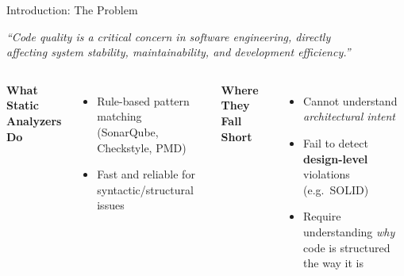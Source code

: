 \documentclass[aspectratio=169,10pt]{beamer}
\begin{document}
\begin{frame}{Introduction: The Problem}
  \vspace{0.3cm}
  \begin{block}{}
    \centering\normalsize\itshape
    ``Code quality is a critical concern in software engineering, directly\\
    affecting system stability, maintainability, and development efficiency.''
  \end{block}
  \vspace{0.5cm}
  \begin{columns}[T]
      \textbf{What Static Analyzers Do}
      \begin{itemize}\small
        \item Rule-based pattern matching (SonarQube, Checkstyle, PMD)
        \item Fast and reliable for syntactic/structural issues
      \end{itemize}
      \textbf{Where They Fall Short}
      \begin{itemize}\small
        \item Cannot understand \emph{architectural intent}
        \item Fail to detect \textbf{design-level} violations (e.g.\ SOLID)
        \item Require understanding \emph{why} code is structured the way it is
      \end{itemize}
  \end{columns}
\end{frame}
\end{document}

